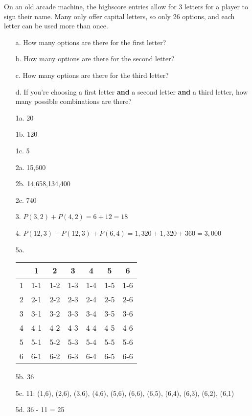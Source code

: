 {    
    \begin{questionNOGRADE}{\thequestion}
        On an old arcade machine, the highscore entries allow for
        3 letters for a player to sign their name. Many only offer capital letters,
        so only 26 options, and each letter can be used more than once.
        
        \begin{enumerate}
            \item[a.]   How many options are there for the first letter?
            \item[b.]   How many options are there for the second letter?
            \item[c.]   How many options are there for the third letter?
            \item[d.]   If you're choosing a first letter \textbf{and} a second letter \textbf{and} a third letter,
                        how many possible combinations are there?
        \end{enumerate}
    \end{questionNOGRADE}
    
}{
    \begin{itemize}
        \item[1a.]  20
        \item[1b.]  120
        \item[1c.]  5
        \item[2a.]  15,600
        \item[2b.]  14,658,134,400
        \item[2c.]  740
        \item[3.]   $P(3,2) + P(4,2) = 6 + 12 = 18$
        \item[4.]   $P(12,3) + P(12,3) + P(6,4) = 1,320 + 1,320 + 360 = 3,000$
        
        \item[5a.]  
                    \begin{tabular}{ c | c c c c c c}
                        & 1 & 2 & 3 & 4 & 5 & 6
                        \\ \hline
                        1 & 1-1 & 1-2 & 1-3 & 1-4 & 1-5 & 1-6
                        \\
                        2 & 2-1 & 2-2 & 2-3 & 2-4 & 2-5 & 2-6
                        \\
                        3 & 3-1 & 3-2 & 3-3 & 3-4 & 3-5 & 3-6
                        \\
                        4 & 4-1 & 4-2 & 4-3 & 4-4 & 4-5 & 4-6
                        \\
                        5 & 5-1 & 5-2 & 5-3 & 5-4 & 5-5 & 5-6
                        \\
                        6 & 6-1 & 6-2 & 6-3 & 6-4 & 6-5 & 6-6
                    \end{tabular}
        \item[5b.]  36
        \item[5c.]  11: (1,6), (2,6), (3,6), (4,6), (5,6), (6,6), (6,5), (6,4), (6,3), (6,2), (6,1)
        \item[5d.]  36 - 11 = 25
        

\end{itemize}}
